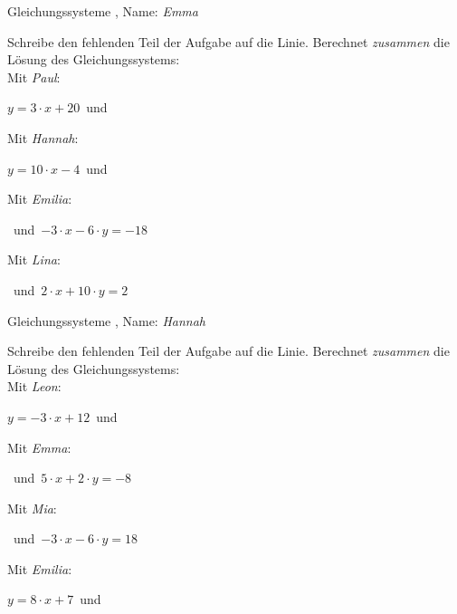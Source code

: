\newpage
\begin{center}\large Gleichungssysteme
, Name: \emph{Emma}\end{center}
Schreibe den fehlenden Teil der Aufgabe auf die Linie. Berechnet \emph{zusammen} die Lösung des Gleichungssystems:
\\
\vfill Mit \emph{Paul}:
\begin{center}$y=3\cdot x+20$\mbox{ }und\mbox{ }\underline{}
\end{center}
\vfill Mit \emph{Hannah}:
\begin{center}$y=10\cdot x-4$\mbox{ }und\mbox{ }\underline{}
\end{center}
\vfill Mit \emph{Emilia}:
\begin{center}\underline{}
\mbox{ }und\mbox{ }$-3\cdot x-6\cdot y=-18$\end{center}
\vfill Mit \emph{Lina}:
\begin{center}\underline{}
\mbox{ }und\mbox{ }$2\cdot x+10\cdot y=2$\end{center}
\newpage
\begin{center}\large Gleichungssysteme
, Name: \emph{Hannah}\end{center}
Schreibe den fehlenden Teil der Aufgabe auf die Linie. Berechnet \emph{zusammen} die Lösung des Gleichungssystems:
\\
\vfill Mit \emph{Leon}:
\begin{center}$y=-3\cdot x+12$\mbox{ }und\mbox{ }\underline{}
\end{center}
\vfill Mit \emph{Emma}:
\begin{center}\underline{}
\mbox{ }und\mbox{ }$5\cdot x+2\cdot y=-8$\end{center}
\vfill Mit \emph{Mia}:
\begin{center}\underline{}
\mbox{ }und\mbox{ }$-3\cdot x-6\cdot y=18$\end{center}
\vfill Mit \emph{Emilia}:
\begin{center}$y=8\cdot x+7$\mbox{ }und\mbox{ }\underline{}
\end{center}
